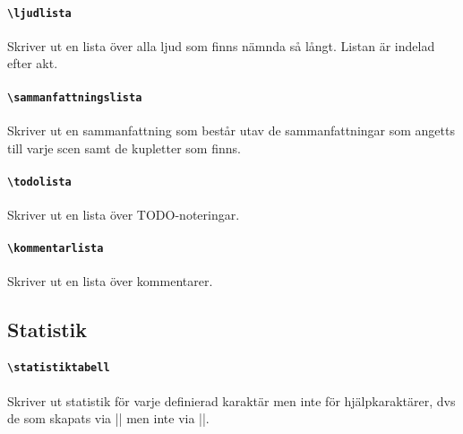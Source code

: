 \documentclass[a4paper,12pt]{article}
\begin{document}
\paragraph{\tt\bfseries\textbackslash ljudlista}
Skriver ut en lista över alla ljud som finns nämnda så långt. Listan är indelad efter akt. 

\paragraph{\tt\bfseries\textbackslash sammanfattningslista}
Skriver ut en sammanfattning som består utav de sammanfattningar som angetts till varje scen samt de kupletter som finns.

\paragraph{\tt\bfseries\textbackslash todolista}
Skriver ut en lista över TODO-noteringar.

\paragraph{\tt\bfseries\textbackslash kommentarlista}
Skriver ut en lista över kommentarer.

\subsection*{Statistik}
\paragraph{\tt\bfseries\textbackslash statistiktabell}
\label{sec:statistik}
Skriver ut statistik för varje definierad karaktär men inte för hjälpkaraktärer, dvs de som skapats via |\nyroll| men inte via ||.
\end{document}
